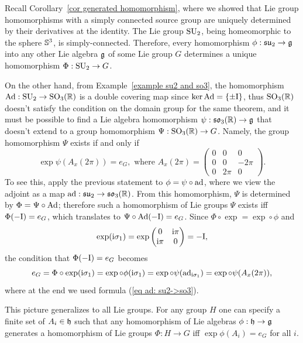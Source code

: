 \begin{example}
    Recall Corollary~\ref{cor generated homomorphism}, where we showed that Lie group homomorphisms with a simply connected source group are uniquely determined by their derivatives at the identity. The Lie group $\operatorname{SU}_2$, being homeomorphic to the sphere $\mathbb{S}^3$, is simply-connected. Therefore, every homomorphism $\phi:\mathfrak{su}_2\to\mathfrak{g}$ into any other Lie algebra $\mathfrak{g}$ of some Lie group $G$ determines a unique homomorphism $\Phi:\operatorname{SU}_2\to G$. 
    
    On the other hand, from Example~\ref{example su2 and so3}, the homomorphism $\mathrm{Ad}:\operatorname{SU}_2\to \operatorname{SO}_3(\mathbb{R})$ is a double covering map since $\ker\mathrm{Ad}=\{\pm \mathrm{I}\}$, thus $\operatorname{SO}_3(\mathbb{R})$ doesn't satisfy the condition on the domain group for the same theorem, and it must be possible to find a Lie algebra homomorphism $\psi:\mathfrak{so}_3(\mathbb{R})\to\mathfrak{g}$ that doesn't extend to a group homomorphism $\Psi:\operatorname{SO}_3(\mathbb{R})\to G$. Namely, the group homomorphism $\Psi$ exists if and only if 
    \[\exp \psi(A_{x}(2\pi))=e_G,\text{ where }A_x(2\pi)=
    \begin{pmatrix}
        0&0&0\\
        0&0&-2\pi\\
        0&2\pi &0
    \end{pmatrix}.
    \]
    To see this, apply the previous statement to $\phi=\psi\circ\mathrm{ad}$, where we view the adjoint as a map $\mathrm{ad}:\mathfrak{su}_2\to\mathfrak{so}_3(\mathbb{R})$. From this homomorphism, $\Psi$ is determined by $\Phi=\Psi\circ \mathrm{Ad}$; therefore such a homomorphism of Lie groups $\Psi$ exists iff $\Phi(-\mathrm{I})=e_G$, which translates to $\Psi\circ \mathrm{Ad}(-\mathrm{I})=e_G$. Since $\Phi\circ\exp=\exp\circ\phi$ and 
    \[\exp(\mathrm{i}\sigma_1)=\exp \begin{pmatrix}
        0&\mathrm{i}\pi\\\mathrm{i}\pi &0
    \end{pmatrix}=-\mathrm{I},\]
    the condition that $\Phi(-\mathrm{I})=e_G$ becomes
    \[e_G=\Phi\circ \exp (\mathrm{i}\sigma_1)=\exp\circ\phi (\mathrm{i}\sigma_1)=\exp\circ\psi( \mathrm{ad}_{\mathrm{i}\sigma_1})=\exp\circ\psi (A_x(2\pi)),\]
    where at the end we used formula (\ref{eq ad: su2->so3}).
    
    This picture generalizes to all Lie groups. For any group $H$ one can specify a finite set of $A_i\in\mathfrak{h}$ such that any homomorphism of Lie algebras $\phi:\mathfrak{h}\to\mathfrak{g}$ generates a homomorphism of Lie groups $\Phi:H\to G$ iff $\exp\phi(A_i)=e_G$ for all $i$.
\end{example}


